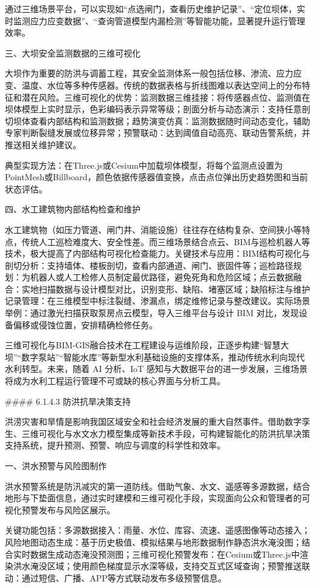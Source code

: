 通过三维场景平台，可以实现如``点选闸门，查看历史维护记录''、``定位坝体，实时监测应力应变数据''、``查询管道模型内漏检测''等智能功能，显著提升运行管理效率。

三、大坝安全监测数据的三维可视化

大坝作为重要的防洪与调蓄工程，其安全监测体系一般包括位移、渗流、应力应变、温度、水位等多种传感器。传统的数据表格与折线图难以表达空间上的分布特征和潜在风险。三维可视化的优势：监测数据三维挂接：将传感器点位、监测值在坝体模型上实时显示，色彩编码表示异常等级；剖面分析与动态演示：支持任意剖切坝体查看内部结构和监测数据；趋势演变仿真：监测数据随时间动态变化，辅助专家判断裂缝发展或位移异常；预警联动：达到阈值自动高亮、联动告警系统，并推送相关维护建议。

典型实现方法：在Three.js或Cesium中加载坝体模型，将每个监测点设置为PointMesh或Billboard，颜色依据传感器值变换，点击点位弹出历史趋势图和当前状态评估。

四、水工建筑物内部结构检查和维护

水工建筑物（如压力管道、闸门井、消能设施）往往存在结构复杂、空间狭小等特点，传统人工巡检难度大、安全性差。而三维场景结合点云、BIM与巡检机器人等技术，极大提高了内部结构可视化检查能力。关键技术与应用：BIM结构可视化与剖切分析：支持墙体、楼板剖切，查看内部通道、闸门、嵌固件等；巡检路径规划：为机器人或人工检修人员制定最优路径，避免死角和危险区域；点云数据融合：实地扫描数据与设计模型对比，识别变形、缺陷、堵塞区域；缺陷标注与维护记录管理：在三维模型中标注裂缝、渗漏点，绑定维修记录与整改建议。实际场景举例：通过激光扫描获取泵房点云模型，导入三维平台与设计 BIM 对比，发现设备偏移或侵蚀位置，安排精确检修任务。

三维可视化与BIM-GIS融合技术在工程建设与运维阶段，正逐步构建``智慧大坝''``数字泵站''``智能水库''等新型水利基础设施的支撑体系，推动传统水利向现代水利转型。未来，随着 AI 分析、IoT 感知与大数据平台的进一步发展，三维场景将成为水利工程运行管理不可或缺的核心界面与分析工具。

\#\#\#\# 6.1.4.3 防洪抗旱决策支持

洪涝灾害和旱情是影响我国区域安全和社会经济发展的重大自然事件。借助数字孪生、三维可视化与水文水力模型集成等新技术手段，可构建智能化的防洪抗旱决策支持系统，提升预测、预警、响应与调度的科学性和效率。

一、洪水预警与风险图制作

洪水预警系统是防汛减灾的第一道防线。借助气象、水文、遥感等多源数据，结合地形与下垫面信息，通过实时建模和三维可视化手段，实现面向公众和管理者的可视化预警发布与风险区展示。

关键功能包括：多源数据接入：雨量、水位、库容、流速、遥感图像等动态接入；风险地图动态生成：基于历史极值、模拟结果与地形数据制作静态洪水淹没图；结合实时数据生成动态淹没预测图；三维可视化预警发布：在Cesium或Three.js中渲染洪水淹没区域；使用颜色梯度显示水深等级，支持交互式区域查询；预警推送联动：通过短信、广播、APP等方式联动发布多级预警信息。

